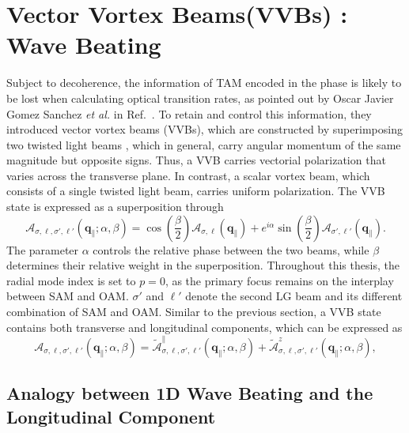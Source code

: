 %
%
%
%
%
\section{Vector Vortex Beams(VVBs) : Wave Beating}

Subject to decoherence, the information of TAM encoded in the phase is likely to be lost when calculating optical transition rates, as pointed out by Oscar Javier Gomez Sanchez \textit{et al.} in Ref.~\cite{sanchez2024enhanced}. To retain and control this information, they introduced vector vortex beams (VVBs), which are constructed by superimposing two twisted light beams , which in general, carry angular momentum of the same magnitude but opposite signs. Thus, a VVB carries vectorial polarization that varies across the transverse plane. In contrast, a scalar vortex beam, which consists of a single twisted light beam, carries uniform polarization. The VVB state is expressed as a superposition through
\begin{equation}
\boldsymbol{\mathcal{A}}_{\sigma, \ell, \sigma', \ell'}(\boldsymbol{q}_\parallel;\alpha,\beta)
=
\cos{\left(\frac{\beta}{2}\right)}
\boldsymbol{\mathcal{A}}_{\sigma, \ell}(\boldsymbol{q}_\parallel)
+
e^{i \alpha}
\sin{\left(\frac{\beta}{2}\right)}
\boldsymbol{\mathcal{A}}_{\sigma', \ell'}(\boldsymbol{q}_\parallel).
\end{equation}
The parameter $\alpha$ controls the relative phase between the two beams, while $\beta$ determines their relative weight in the superposition.  Throughout this thesis, the radial mode index is set to $p=0$, as the primary focus remains on the interplay between SAM and OAM. $\sigma'$ and $\ell'$ denote the second LG beam and its different combination of SAM and OAM.
\begingroup
\color{red} %
Similar to the previous section, a VVB state contains both transverse and longitudinal components, which can be expressed as
\begin{equation}
\boldsymbol{\mathcal{A}}_{\sigma, \ell, \sigma', \ell'}(\boldsymbol{q}_\parallel;\alpha,\beta)
= \boldsymbol{\tilde{\mathcal{A}}}_{\sigma, \ell, \sigma', \ell'}^\parallel(\boldsymbol{q}_\parallel;\alpha,\beta)
+ \boldsymbol{\tilde{\mathcal{A}}}_{\sigma, \ell, \sigma', \ell'}^z(\boldsymbol{q}_\parallel;\alpha,\beta),
\end{equation}

\subsection{Analogy between 1D Wave Beating and the Longitudinal Component}

